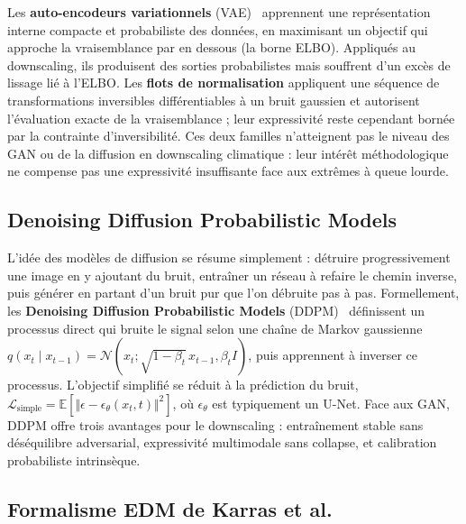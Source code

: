 Les \textbf{auto-encodeurs variationnels} (VAE)~\cite{kingma_vae_2014} apprennent une représentation interne compacte et probabiliste des données, en maximisant un objectif qui approche la vraisemblance par en dessous (la borne ELBO). Appliqués au downscaling, ils produisent des sorties probabilistes mais souffrent d'un excès de lissage lié à l'ELBO. Les \textbf{flots de normalisation} appliquent une séquence de transformations inversibles différentiables à un bruit gaussien et autorisent l'évaluation exacte de la vraisemblance ; leur expressivité reste cependant bornée par la contrainte d'inversibilité. Ces deux familles n'atteignent pas le niveau des GAN ou de la diffusion en downscaling climatique : leur intérêt méthodologique ne compense pas une expressivité insuffisante face aux extrêmes à queue lourde.\label{ssec:soa-vae}\label{ssec:soa-flow}\label{ssec:soa-vrai-bilan}

\label{sec:soa-diff}

\subsection{Denoising Diffusion Probabilistic Models}
\label{ssec:soa-ddpm}

L'idée des modèles de diffusion se résume simplement : détruire progressivement une image en y ajoutant du bruit, entraîner un réseau à refaire le chemin inverse, puis générer en partant d'un bruit pur que l'on débruite pas à pas. Formellement, les \textbf{Denoising Diffusion Probabilistic Models} (DDPM)~\cite{ho_ddpm_2020} définissent un processus direct qui bruite le signal selon une chaîne de Markov gaussienne $q(x_t \mid x_{t-1}) = \mathcal{N}(x_t; \sqrt{1 - \beta_t}\, x_{t-1}, \beta_t I)$, puis apprennent à inverser ce processus. L'objectif simplifié se réduit à la prédiction du bruit, $\mathcal{L}_{\mathrm{simple}} = \mathbb{E}[\Vert \epsilon - \epsilon_\theta(x_t, t)\Vert^2]$, où $\epsilon_\theta$ est typiquement un U-Net. Face aux GAN, DDPM offre trois avantages pour le downscaling : entraînement stable sans déséquilibre adversarial, expressivité multimodale sans collapse, et calibration probabiliste intrinsèque.

\subsection{Formalisme EDM de Karras et al.}
\label{ssec:soa-edm}

